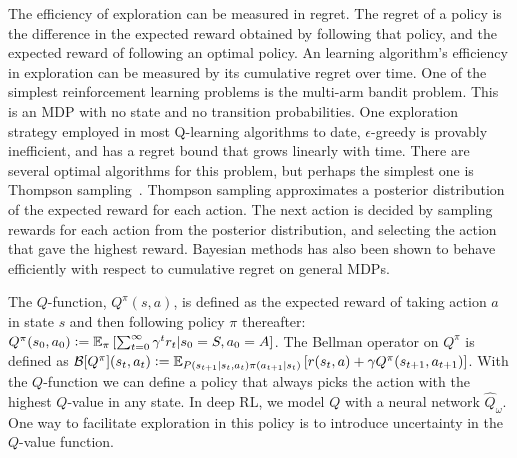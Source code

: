 \documentclass[]{uai2021} %
\newcommand{\defeq}{\vcentcolon=}
\newcommand{\E}{\mathbb{E}}
\newcommand{\B}{\mathcal{B}}
\begin{document}
The efficiency of exploration can be measured in regret.
The regret of a policy is the difference in the expected reward obtained by
following that policy, and the expected reward of following an optimal policy.
An learning algorithm's efficiency in exploration can be measured by its
cumulative regret over time. One of the simplest reinforcement learning 
problems is the multi-arm bandit problem. This is an MDP with no state and no
transition probabilities. One exploration strategy employed in most Q-learning
algorithms to date, \(\epsilon\)-greedy is provably inefficient, and has a
regret bound that grows linearly with time. There are several optimal algorithms
for this problem, but perhaps the simplest one is Thompson sampling~\citep{thompson_likelihood_1933}.
Thompson sampling approximates a posterior distribution of the expected reward
for each action. The next action is decided by sampling rewards for each action
from the posterior distribution, and selecting the action that gave the highest
reward. Bayesian methods has also been shown to behave efficiently with respect
to cumulative regret \cite{osband_generalization_2016} on general MDPs.


The \(Q\)-function, \(Q^\pi(s,a)\), is defined as the expected reward of taking action
\(a\) in state \(s\) and then following policy \(\pi\) thereafter:
\(Q^\pi(s_0, a_0) \defeq \E_\pi \left[ \sum_{t=0}^\infty \gamma^t r_t \vert s_0=S, a_0=A \right]\).
The Bellman operator on \(Q^\pi\) is defined as
\(\B[Q^\pi](s_t,a_t) \defeq \E_{P(s_{t+1} \vert s_t, a_t)\pi(a_{t+1} \vert s_t)}
\left[ r(s_t, a) + \gamma Q^\pi(s_{t+1}, a_{t+1}) \right]\). With the
\(Q\)-function we can define a policy that always picks the action with the 
highest \(Q\)-value in any state. In deep RL, we model \(Q\) with a
neural network \(\hat{Q}_\omega\). One way to facilitate exploration in this
policy is to introduce uncertainty in the
\(Q\)-value function.
\end{document}
